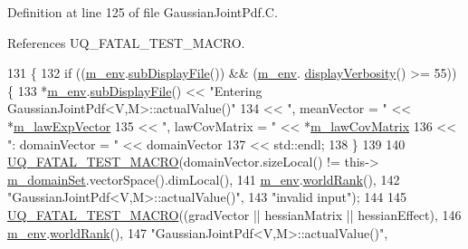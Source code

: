 Definition at line 125 of file Gaussian\-Joint\-Pdf.\-C.



References U\-Q\-\_\-\-F\-A\-T\-A\-L\-\_\-\-T\-E\-S\-T\-\_\-\-M\-A\-C\-R\-O.


\begin{DoxyCode}
131 \{
132   \textcolor{keywordflow}{if} ((\hyperlink{class_q_u_e_s_o_1_1_base_scalar_function_adf44141aeb765d97613286f88f235f04}{m\_env}.\hyperlink{class_q_u_e_s_o_1_1_base_environment_a8a0064746ae8dddfece4229b9ad374d6}{subDisplayFile}()) && (\hyperlink{class_q_u_e_s_o_1_1_base_scalar_function_adf44141aeb765d97613286f88f235f04}{m\_env}.
      \hyperlink{class_q_u_e_s_o_1_1_base_environment_a1fe5f244fc0316a0ab3e37463f108b96}{displayVerbosity}() >= 55)) \{
133     *\hyperlink{class_q_u_e_s_o_1_1_base_scalar_function_adf44141aeb765d97613286f88f235f04}{m\_env}.\hyperlink{class_q_u_e_s_o_1_1_base_environment_a8a0064746ae8dddfece4229b9ad374d6}{subDisplayFile}() << \textcolor{stringliteral}{"Entering GaussianJointPdf<V,M>::actualValue()"}
134                             << \textcolor{stringliteral}{", meanVector = "}   << *\hyperlink{class_q_u_e_s_o_1_1_gaussian_joint_pdf_a8ef2407f5234ce5e0ed0d05a21f183e5}{m\_lawExpVector}
135                       << \textcolor{stringliteral}{", lawCovMatrix = "} << *\hyperlink{class_q_u_e_s_o_1_1_gaussian_joint_pdf_af13b72027783d8db03721951a71087d8}{m\_lawCovMatrix}
136                             << \textcolor{stringliteral}{": domainVector = "} << domainVector
137                             << std::endl;
138   \}
139 
140   \hyperlink{_defines_8h_a56d63d18d0a6d45757de47fcc06f574d}{UQ\_FATAL\_TEST\_MACRO}(domainVector.sizeLocal() != this->
      \hyperlink{class_q_u_e_s_o_1_1_base_scalar_function_a67696e86211197938c72cd11863f5cf8}{m\_domainSet}.vectorSpace().dimLocal(),
141                       \hyperlink{class_q_u_e_s_o_1_1_base_scalar_function_adf44141aeb765d97613286f88f235f04}{m\_env}.\hyperlink{class_q_u_e_s_o_1_1_base_environment_a78b57112bbd0e6dd0e8afec00b40ffa7}{worldRank}(),
142                       \textcolor{stringliteral}{"GaussianJointPdf<V,M>::actualValue()"},
143                       \textcolor{stringliteral}{"invalid input"});
144 
145   \hyperlink{_defines_8h_a56d63d18d0a6d45757de47fcc06f574d}{UQ\_FATAL\_TEST\_MACRO}((gradVector || hessianMatrix || hessianEffect),
146                       \hyperlink{class_q_u_e_s_o_1_1_base_scalar_function_adf44141aeb765d97613286f88f235f04}{m\_env}.\hyperlink{class_q_u_e_s_o_1_1_base_environment_a78b57112bbd0e6dd0e8afec00b40ffa7}{worldRank}(),
147                       \textcolor{stringliteral}{"GaussianJointPdf<V,M>::actualValue()"},

\end{DoxyCode}
